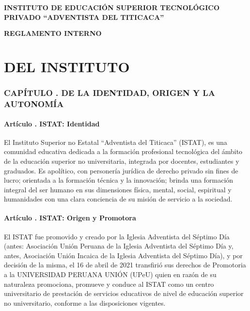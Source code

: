
\setcounter{secnumdepth}{0}
\setcounter{tocdepth}{1}

\addtocounter{ns}{1}

\addtocounter{re}{1}
\setcounter{re}{1}

\addtocounter{su}{1}

\newpage

\begin{center}
\textbf{\textcolor{istat}{INSTITUTO DE EDUCACIÓN SUPERIOR TECNOLÓGICO PRIVADO “ADVENTISTA DEL TITICACA”}}
\end{center}

\begin{center}
\textbf{\textcolor{istat}{REGLAMENTO INTERNO}}
\end{center}
\renewcommand{\partname}{TÍTULO}

\part{DEL INSTITUTO}
\section{CAPÍTULO . DE LA IDENTIDAD, ORIGEN Y LA AUTONOMÍA }
\addtocounter{re}{1}
\subsection{Artículo . ISTAT: Identidad}
\addtocounter{ns}{1}
El Instituto Superior no Estatal “Adventista del Titicaca” (ISTAT), es una comunidad educativa dedicada a la formación profesional tecnológica del ámbito de la educación superior no universitaria, integrada por docentes, estudiantes y graduados. Es apolítico, con personería jurídica de derecho privado sin fines de lucro; orientada a la formación técnica y la innovación; brinda una formación integral del ser humano en sus dimensiones física, mental, social, espiritual y humanidades con una clara conciencia de su misión de servicio a la sociedad. 
\subsection{Artículo . ISTAT: Origen y Promotora}
\addtocounter{ns}{1}
El ISTAT fue promovido y creado por la Iglesia Adventista del Séptimo Día (antes: Asociación Unión Peruana de la Iglesia Adventista del Séptimo Día y, antes, Asociación Unión Incaica de la Iglesia Adventista del Séptimo Día), y por decisión de la misma, el 16 de abril de 2021 transfirió sus derechos de Promotoria a la UNIVERSIDAD PERUANA UNIÓN (UPeU) quien en razón de su naturaleza promociona, promueve y conduce al ISTAT como un centro universitario de prestación de servicios educativos de nivel de educación superior no universitario, conforme a las disposiciones vigentes.

